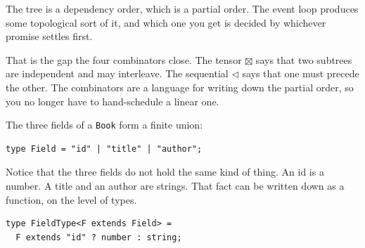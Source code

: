 \documentclass[aspectratio=169,12pt]{beamer}
\begin{document}
\begin{frame}
\vfill
\begin{center}
\begin{minipage}{0.92\textwidth}
\raggedright
\large

The tree is a dependency order, which is a partial order. The event loop produces some topological
sort of it, and which one you get is decided by whichever promise settles first.

\medskip

That is the gap the four combinators close. The tensor $\boxtimes$ says that two subtrees are
independent and may interleave. The sequential $\lhd$ says that one must precede the other. The
combinators are a language for writing down the partial order, so you no longer have to
hand-schedule a linear one.

\end{minipage}
\end{center}
\vfill
\end{frame}

\begin{frame}[fragile]
\vfill
\begin{center}
\begin{minipage}{0.92\textwidth}
\raggedright
\large

The three fields of a \texttt{Book} form a finite union:

\medskip

\begin{lstlisting}[basicstyle=\ttfamily\small,morekeywords={type}]
type Field = "id" | "title" | "author";
\end{lstlisting}

\medskip

Notice that the three fields do not hold the same kind of thing. An id is a number. A title
and an author are strings. That fact can be written down as a function, on the level of types.

\medskip

\begin{lstlisting}[basicstyle=\ttfamily\small,morekeywords={type,extends}]
type FieldType<F extends Field> =
  F extends "id" ? number : string;
\end{lstlisting}

\end{minipage}
\end{center}
\vfill
\end{frame}
\end{document}
